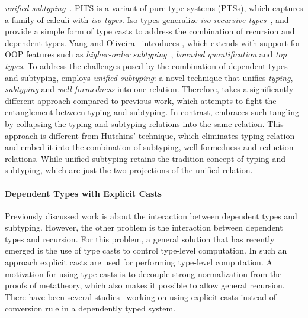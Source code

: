 \emph{unified subtyping}~\cite{full}. PITS is a variant of pure type systems (PTSs),
which captures a family of calculi with \emph{iso-types}. Iso-types generalize \emph{iso-recursive
types}~\cite{tapl}, and provide a simple form of
type casts to address the combination of recursion and
dependent types.
Yang and Oliveira~\cite{full} introduces \name, which extends
\lami with support for OOP features such as
\emph{higher-order subtyping}~\cite{fsubo}, \emph{bounded quantification} and
\emph{top types}.
To address the challenges posed by
the combination of dependent types and subtyping, \name
employs \emph{unified subtyping}: a novel technique that unifies
\emph{typing}, \emph{subtyping} and \emph{well-formedness} into one
relation. Therefore, \name takes a significantly different
approach compared to previous work, which
attempts to fight the entanglement between typing and subtyping. In
contrast, \name embraces such
tangling by collapsing the typing and subtyping
relations into the same relation. This approach is different from
Hutchins' technique, which eliminates typing relation and embed it into
the combination of subtyping, well-formedness and reduction relations.
While unified subtyping
retains the tradition concept of typing and subtyping, which are just the two
projections of the unified relation.


\paragraph{Dependent Types with Explicit Casts} Previously
discussed work is about the interaction between dependent types and
subtyping. However, the other problem is the
interaction between dependent types and recursion. For this
problem, a general solution that has recently emerged is the use
of type casts to control type-level computation. In such an approach explicit casts
are used for performing type-level computation. A motivation for
using type casts is to decouple strong normalization from the
proofs of metatheory, which also makes it possible to allow general
recursion. There have been several studies~\cite{guru,sjoberg:msfp12,
  kimmel:plpv, zombie:popl15, fc:kind, Doorn:2013hq,isotype} working
on using explicit casts instead of conversion rule in a dependently
typed system. 
